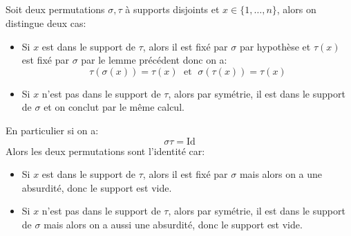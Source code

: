 \documentclass{report}
\begin{document}
      \subsection*{}
         Soit deux permutations $\sigma, \tau$ à supports disjoints et $x \in \{1, \ldots, n\}$, alors on distingue deux cas:
         \begin{itemize}
            \item Si $x$ est dans le support de $\tau$, alors il est fixé par $\sigma$ par hypothèse et \(\tau(x)\) est fixé par \(\sigma\) par le lemme précédent donc on a:
            $$
               \tau(\sigma(x)) = \tau(x) \; \text{ et } \; \sigma(\tau(x)) = \tau(x)
            $$
            \item Si $x$ n'est pas dans le support de $\tau$, alors par symétrie, il est dans le support de $\sigma$ et on conclut par le même calcul.
         \end{itemize}
         En particulier si on a:
         $$
            \sigma\tau = \text{Id}
         $$
         Alors les deux permutations sont l'identité car:
         \begin{itemize}
            \item Si $x$ est dans le support de $\tau$, alors il est fixé par $\sigma$ mais alors on a une absurdité, donc le support est vide.
            \item Si $x$ n'est pas dans le support de $\tau$, alors par symétrie, il est dans le support de $\sigma$ mais alors on a aussi une absurdité, donc le support est vide.
         \end{itemize}     
\end{document}
